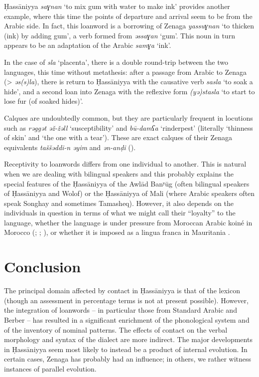 \documentclass[output=paper]{langsci/langscibook}
\begin{document}
Ḥassāniyya \textit{saɣnan} ‘to mix gum with water to make ink’ provides another example, where this time the points of departure and arrival seem to be from the Arabic side. In fact, this loanword is a borrowing of Zenaga \textit{yassuɣnan} ‘to thicken (ink) by adding gum’, a verb formed from \textit{əssaɣan} ‘gum’. This noun in turn appears to be an adaptation of the Arabic \textit{samɣa} ‘ink’. 

In the case of \textit{sla} ‘placenta’, there is a double round-trip between the two languages, this time without metathesis: after a passage from Arabic to Zenaga (> \textit{əs(s)la}), there is return to Ḥassāniyya with the causative verb \textit{sasla} ‘to soak a hide’, and a second loan into Zenaga with the reflexive form \textit{(yə)stasla} ‘to start to lose fur (of soaked hides)’.


Calques are undoubtedly common, but they are particularly frequent in locutions such as \textit{rəggət} \textit{əž-žəll} ‘susceptibility’ and \textit{bū-damʕa} ‘rinderpest’ (literally ‘thinness of skin’ and ‘the one with a tear’). These are exact calques of their Zenaga equivalents \textit{taššəddi-n} \textit{əyim} and \textit{ən-anḍi} (\citealt{Taine-Cheikh2008chapter}).


Receptivity to loanwords differs from one individual to another. This is natural when we are dealing with bilingual speakers and this probably explains the special features of the Ḥassāniyya of the Awlād Banʸūg (often bilingual speakers of Ḥassāniyya and Wolof) or the Ḥassāniyya of Mali (where Arabic speakers often speak Songhay and sometimes Tamasheq). However, it also depends on the individuals in question in terms of what we might call their “loyalty” to the language, whether the language is under pressure from Moroccan Arabic koiné in Morocco (\citealt{Taine-Cheikh1997socio}; \citealt{Heath2002}; \citealt{Paciotti2017}), or whether it is imposed as a lingua franca in Mauritania \citep{Dia2007}.

\section{Conclusion} %

The principal domain affected by contact in Ḥassāniyya is that of the lexicon (though an assessment in percentage terms is not at present possible). However, the integration of loanwords – in particular those from Standard Arabic and Berber – has resulted in a significant enrichment of the phonological system and of the inventory of nominal patterns. The effects of contact on the verbal morphology and syntax of the dialect are more indirect. The major developments in Ḥassāniyya seem most likely to instead be a product of internal evolution. In certain cases, Zenaga has probably had an influence; in others, we rather witness instances of parallel evolution. 
\end{document}
